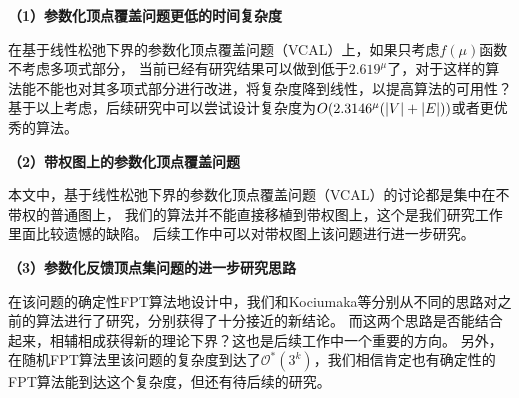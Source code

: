 \textbf{（1）参数化顶点覆盖问题更低的时间复杂度}

在基于线性松弛下界的参数化顶点覆盖问题（VCAL）上，如果只考虑$f(\mu)$函数不考虑多项式部分，
当前已经有研究结果可以做到低于$2.619^\mu$了，对于这样的算法能不能也对其多项式部分进行改进，将复杂度降到线性，以提高算法的可用性？
基于以上考虑，后续研究中可以尝试设计复杂度为$O(2.3146^\mu(\left\vert V \right\vert + \left\vert E \right\vert))$或者更优秀的算法。

\textbf{（2）带权图上的参数化顶点覆盖问题}

本文中，基于线性松弛下界的参数化顶点覆盖问题（VCAL）的讨论都是集中在不带权的普通图上，
我们的算法并不能直接移植到带权图上，这个是我们研究工作里面比较遗憾的缺陷。
后续工作中可以对带权图上该问题进行进一步研究。

\textbf{（3）参数化反馈顶点集问题的进一步研究思路}

在该问题的确定性FPT算法地设计中，我们和Kociumaka等分别从不同的思路对之前的算法进行了研究，分别获得了十分接近的新结论。
而这两个思路是否能结合起来，相辅相成获得新的理论下界？这也是后续工作中一个重要的方向。
另外，在随机FPT算法里该问题的复杂度到达了$\mathcal{O}^*(3^k)$，我们相信肯定也有确定性的FPT算法能到达这个复杂度，但还有待后续的研究。